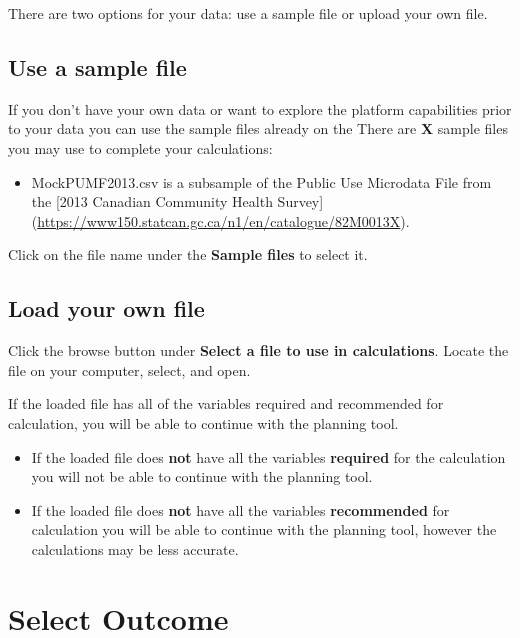 \documentclass[]{book}
\providecommand{\tightlist}{%
  \setlength{\itemsep}{0pt}\setlength{\parskip}{0pt}}
\begin{document}
There are two options for your data: use a sample file or upload your
own file.

\subsection{Use a sample file}\label{use-a-sample-file}

If you don't have your own data or want to explore the platform
capabilities prior to your data you can use the sample files already on
the There are \textbf{X} sample files you may use to complete your
calculations:

\begin{itemize}
\tightlist
\item
  MockPUMF2013.csv is a subsample of the Public Use Microdata File from
  the {[}2013 Canadian Community Health Survey{]}
  (\url{https://www150.statcan.gc.ca/n1/en/catalogue/82M0013X}).
\end{itemize}

Click on the file name under the \textbf{Sample files} to select it.

\subsection{Load your own file}\label{load-your-own-file}

Click the browse button under \textbf{Select a file to use in
calculations}. Locate the file on your computer, select, and open.

If the loaded file has all of the variables required and recommended for
calculation, you will be able to continue with the planning tool.

\begin{itemize}
\item
  If the loaded file does \textbf{not} have all the variables
  \textbf{required} for the calculation you will not be able to continue
  with the planning tool.
\item
  If the loaded file does \textbf{not} have all the variables
  \textbf{recommended} for calculation you will be able to continue with
  the planning tool, however the calculations may be less accurate.
\end{itemize}

\section{Select Outcome}\label{select-outcome}
\end{document}
